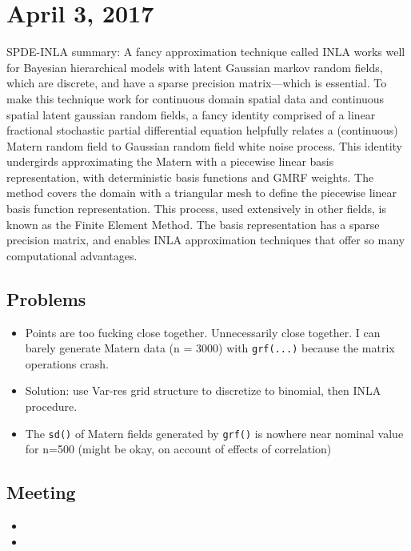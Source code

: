\documentclass{article}
\begin{document}
\section{April 3, 2017}
SPDE-INLA summary: A fancy approximation technique called INLA works well for Bayesian hierarchical models with latent Gaussian markov random fields, which are discrete, and have a sparse precision matrix---which is essential. To make this technique work for continuous domain spatial data and continuous spatial latent gaussian random fields, a fancy identity comprised of a linear fractional stochastic partial differential equation helpfully relates a (continuous) Matern random field to Gaussian random field white noise process. This identity undergirds approximating the Matern with a piecewise linear basis representation, with deterministic basis functions and GMRF weights. The method covers the domain with a triangular mesh to define the piecewise linear basis function representation. This process, used extensively in other fields, is known as the Finite Element Method. The basis representation has a sparse precision matrix, and enables INLA approximation techniques that offer so many computational advantages. 

\subsection{Problems}
\begin{itemize}
\item Points are too fucking close together. Unnecessarily close together. I can barely generate Matern data (n = 3000) with \verb|grf(...)| because the matrix operations crash.
\item Solution: use Var-res grid structure to discretize to binomial, then INLA procedure.
\item The \verb|sd()| of Matern fields generated by \verb|grf()| is nowhere near nominal value for n=500 (might be okay, on account of effects of correlation)
\end{itemize}

\subsection{Meeting}
\begin{itemize}
\item
\item
\end{itemize}
\end{document}
